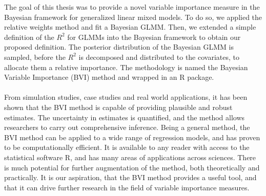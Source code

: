 The goal of this thesis was to provide a novel variable importance measure in the Bayesian framework for generalized linear mixed models. To do so, we applied the relative weights method and fit a Bayesian GLMM. Then, we extended a simple definition of the $R^2$ for GLMMs into the Bayesian framework to obtain our proposed definition. The posterior distribution of the Bayesian GLMM is sampled, before the $R^2$ is decomposed and distributed to the covariates, to allocate them a relative importance. The methodology is named the Bayesian Variable Importance (BVI) method and wrapped in an R package. 
\\
\\
From simulation studies, case studies and real world applications, it has been shown that the BVI method is capable of providing plausible and robust estimates. The uncertainty in estimates is quantified, and the method allows researchers to carry out comprehensive inference. Being a general method, the BVI method can be applied to a wide range of regression models, and has proven to be computationally efficient. It is available to any reader with access to the statistical software R, and has many areas of applications across sciences. There is much potential for further augmentation of the method, both theoretically and practically. It is our aspiration, that the BVI method provides a useful tool, and that it can drive further research in the field of variable importance measures.